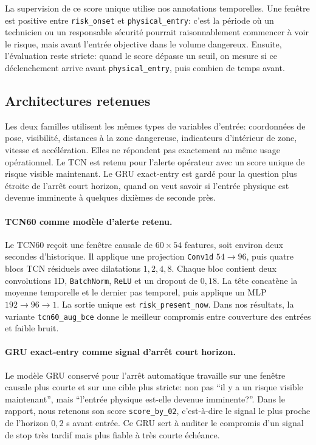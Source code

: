 \documentclass[11pt]{article}
\begin{document}
La supervision de ce score unique utilise nos annotations temporelles. Une fenêtre est positive entre \texttt{risk\_onset} et \texttt{physical\_entry}: c'est la période où un technicien ou un responsable sécurité pourrait raisonnablement commencer à voir le risque, mais avant l'entrée objective dans le volume dangereux. Ensuite, l'évaluation reste stricte: quand le score dépasse un seuil, on mesure si ce déclenchement arrive avant \texttt{physical\_entry}, puis combien de temps avant.

\subsection{Architectures retenues}
Les deux familles utilisent les mêmes types de variables d'entrée: coordonnées de pose, visibilité, distances à la zone dangereuse, indicateurs d'intérieur de zone, vitesse et accélération. Elles ne répondent pas exactement au même usage opérationnel. Le TCN est retenu pour l'alerte opérateur avec un score unique de risque visible maintenant. Le GRU exact-entry est gardé pour la question plus étroite de l'arrêt court horizon, quand on veut savoir si l'entrée physique est devenue imminente à quelques dixièmes de seconde près.

\paragraph{TCN60 comme modèle d'alerte retenu.}
Le TCN60 reçoit une fenêtre causale de $60 \times 54$ features, soit environ deux secondes d'historique. Il applique une projection \texttt{Conv1d} $54 \rightarrow 96$, puis quatre blocs TCN résiduels avec dilatations $1,2,4,8$. Chaque bloc contient deux convolutions 1D, \texttt{BatchNorm}, \texttt{ReLU} et un dropout de $0,18$. La tête concatène la moyenne temporelle et le dernier pas temporel, puis applique un MLP $192 \rightarrow 96 \rightarrow 1$. La sortie unique est \texttt{risk\_present\_now}. Dans nos résultats, la variante \texttt{tcn60\_aug\_bce} donne le meilleur compromis entre couverture des entrées et faible bruit.

\paragraph{GRU exact-entry comme signal d'arrêt court horizon.}
Le modèle GRU conservé pour l'arrêt automatique travaille sur une fenêtre causale plus courte et sur une cible plus stricte: non pas ``il y a un risque visible maintenant'', mais ``l'entrée physique est-elle devenue imminente?''. Dans le rapport, nous retenons son score \texttt{score\_by\_02}, c'est-à-dire le signal le plus proche de l'horizon $0,2$ s avant entrée. Ce GRU sert à auditer le compromis d'un signal de stop très tardif mais plus fiable à très courte échéance.
\end{document}
